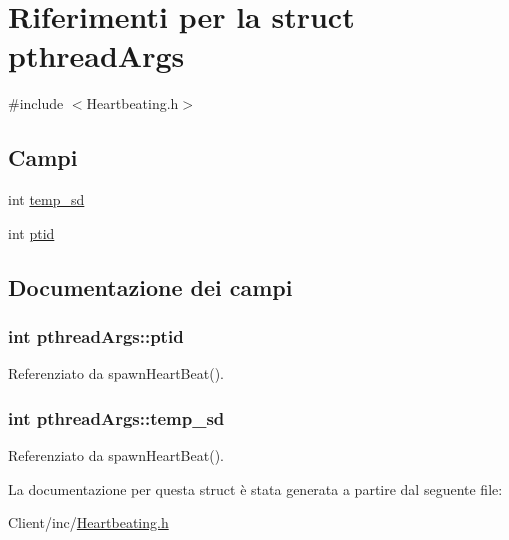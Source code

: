 \hypertarget{structpthreadArgs}{\section{Riferimenti per la struct pthread\+Args}
\label{structpthreadArgs}
}


{\ttfamily \#include $<$Heartbeating.\+h$>$}

\subsection*{Campi}
\begin{DoxyCompactItemize}
\item 
int \hyperlink{structpthreadArgs_a028f49dcb3a6ed77870caacec6f2b968}{temp\+\_\+sd}
\item 
int \hyperlink{structpthreadArgs_abc763a99a614f8e00c11fbbece336516}{ptid}
\end{DoxyCompactItemize}


\subsection{Documentazione dei campi}
\hypertarget{structpthreadArgs_abc763a99a614f8e00c11fbbece336516}{
\subsubsection[{ptid}]{\setlength{\rightskip}{0pt plus 5cm}int pthread\+Args\+::ptid}}\label{structpthreadArgs_abc763a99a614f8e00c11fbbece336516}


Referenziato da spawn\+Heart\+Beat().

\hypertarget{structpthreadArgs_a028f49dcb3a6ed77870caacec6f2b968}{
\subsubsection[{temp\+\_\+sd}]{\setlength{\rightskip}{0pt plus 5cm}int pthread\+Args\+::temp\+\_\+sd}}\label{structpthreadArgs_a028f49dcb3a6ed77870caacec6f2b968}


Referenziato da spawn\+Heart\+Beat().



La documentazione per questa struct è stata generata a partire dal seguente file\+:\begin{DoxyCompactItemize}
\item 
Client/inc/\hyperlink{Client_2inc_2Heartbeating_8h}{Heartbeating.\+h}\end{DoxyCompactItemize}
